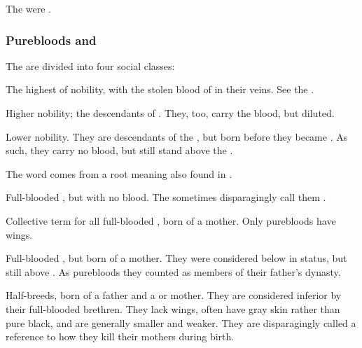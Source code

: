 The \Mystraacht were .





\subsubsection{Purebloods and \ashenbloods}
The \resphain{} are divided into four social classes:
\begin{gloss}
  \gitem[\satharioth]{\sathariah}
  The highest of \resphan{} nobility, with the stolen blood of \Nexagglachel{} in their veins. 
  See the . 
  
  \gitem[\ketherain]{\ketheran}
  Higher nobility; the descendants of \satharioth. 
  They, too, carry the \draconian{} blood, but diluted.   
  
  \gitem[\ruistheleth]{\ruisthel}
  Lower nobility. 
  They are descendants of the \satharioth, but born before they became \satharioth. 
  As such, they carry no \draconian{} blood, but still stand above the \thelyadeth. 
  
  The word comes from a root  meaning \dash also found in . 
  
  \gitem[\thelyadeth]{\thelyad}
  Full-blooded \resphain, but with no \sathariah{} blood. 
  The \ketherain{} sometimes disparagingly call them . 
  
  Collective term for all full-blooded \resphain{}, born of a \resvil{} mother. 
  Only purebloods have wings. 
  
  \gitem[\gessurim]{\gessur}
  Full-blooded \resphain, but born of a  mother. 
  They were considered below \thelyadeth{} in status, but still above \bezedeth. 
  As purebloods they counted as members of their father's dynasty. 
  
  \gitem[\bezedeth]{\bezed}
  Half-breeds, born of a \resphan{} father and a \human{} or \nephilic{} mother. 
  They are considered inferior by their full-blooded brethren. 
  They lack wings, often have gray skin rather than pure black, and are generally smaller and weaker. 
  They are disparagingly called \quo{\ashenbloods}\dash a reference to how they kill their mothers during birth. 
  

\end{gloss}
